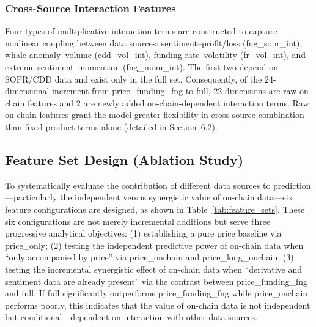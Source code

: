 \documentclass[a4paper]{cas-dc}
\begin{document}
\subsubsection{Cross-Source Interaction Features}

Four types of multiplicative interaction terms are constructed to capture nonlinear coupling between data sources: sentiment--profit/loss (fng\_sopr\_int), whale anomaly--volume (cdd\_vol\_int), funding rate--volatility (fr\_vol\_int), and extreme sentiment--momentum (fng\_mom\_int). The first two depend on SOPR/CDD data and exist only in the full set. Consequently, of the 24-dimensional increment from price\_funding\_fng to full, 22 dimensions are raw on-chain features and 2 are newly added on-chain-dependent interaction terms. Raw on-chain features grant the model greater flexibility in cross-source combination than fixed product terms alone (detailed in Section~6.2).

\subsection{Feature Set Design (Ablation Study)}

To systematically evaluate the contribution of different data sources to prediction---particularly the independent versus synergistic value of on-chain data---six feature configurations are designed, as shown in Table~\ref{tab:feature_sets}. These six configurations are not merely incremental additions but serve three progressive analytical objectives: (1) establishing a pure price baseline via price\_only; (2) testing the independent predictive power of on-chain data when ``only accompanied by price'' via price\_onchain and price\_long\_onchain; (3) testing the incremental synergistic effect of on-chain data when ``derivative and sentiment data are already present'' via the contrast between price\_funding\_fng and full. If full significantly outperforms price\_funding\_fng while price\_onchain performs poorly, this indicates that the value of on-chain data is not independent but conditional---dependent on interaction with other data sources.
\end{document}
